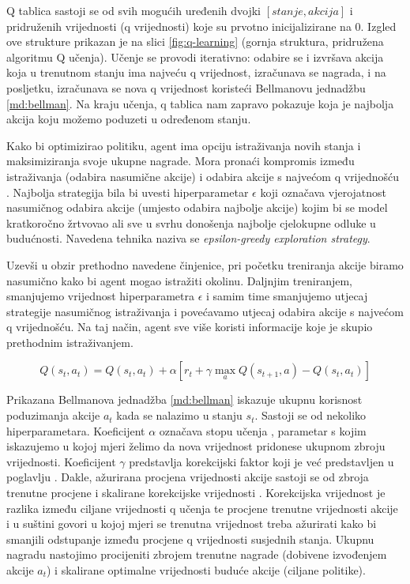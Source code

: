 Q tablica sastoji se od svih mogućih uređenih dvojki $[stanje, akcija]$ i pridruženih vrijednosti (q vrijednosti) koje su prvotno inicijalizirane na $0$. Izgled ove strukture prikazan je na slici \ref{fig:q-learning} (gornja struktura, pridružena algoritmu Q učenja). Učenje se provodi iterativno: odabire se i izvršava akcija koja u trenutnom stanju ima najveću q vrijednost, izračunava se nagrada, i na posljetku, izračunava se nova q vrijednost koristeći Bellmanovu jednadžbu \ref{md:bellman}. Na kraju učenja, q tablica nam zapravo pokazuje koja je najbolja akcija koju možemo poduzeti u određenom stanju.

Kako bi optimizirao politiku, agent ima opciju istraživanja novih stanja i maksimiziranja svoje ukupne nagrade. Mora pronaći kompromis između istraživanja (odabira nasumične akcije)  i odabira akcije s najvećom q vrijednošću . Najbolja strategija bila bi uvesti hiperparametar $\epsilon$ koji označava vjerojatnost nasumičnog odabira akcije (umjesto odabira najbolje akcije) kojim bi se model kratkoročno žrtvovao ali sve u svrhu donošenja najbolje cjelokupne odluke u budućnosti. Navedena tehnika naziva se \textit{epsilon-greedy exploration strategy}.

Uzevši u obzir prethodno navedene činjenice, pri početku treniranja akcije biramo nasumično kako bi agent mogao istražiti okolinu. Daljnjim treniranjem, smanjujemo vrijednost hiperparametra $\epsilon$ i samim time smanjujemo utjecaj strategije nasumičnog istraživanja i povećavamo utjecaj odabira akcije s najvećom q vrijednošću. Na taj način, agent sve više koristi informacije koje je skupio prethodnim istraživanjem. 



\begin{equation}
    \label{md:bellman}
    Q(s_t, a_t) = Q(s_t, a_t) + \alpha \left[ r_t + \gamma \max_a Q(s_{t+1}, a) - Q(s_t, a_t) \right]
\end{equation}

Prikazana Bellmanova jednadžba \ref{md:bellman} iskazuje ukupnu korisnost poduzimanja akcije $a_t$ kada se nalazimo u stanju $s_t$. Sastoji se od nekoliko hiperparametara. Koeficijent $\alpha$ označava stopu učenja , parametar s kojim iskazujemo u kojoj mjeri želimo da nova vrijednost pridonese ukupnom zbroju vrijednosti. Koeficijent $\gamma$ predstavlja korekcijski faktor  koji je već predstavljen u poglavlju . Dakle, ažurirana procjena vrijednosti akcije sastoji se od zbroja trenutne procjene i skalirane korekcijske vrijednosti . Korekcijska vrijednost je razlika između ciljane vrijednosti q učenja  te procjene trenutne vrijednosti akcije i u suštini govori u kojoj mjeri se trenutna vrijednost treba ažurirati kako bi smanjili odstupanje između procjene q vrijednosti susjednih stanja. Ukupnu nagradu nastojimo procijeniti zbrojem trenutne nagrade (dobivene izvođenjem akcije $a_t$) i skalirane optimalne vrijednosti buduće akcije (ciljane politike). 

